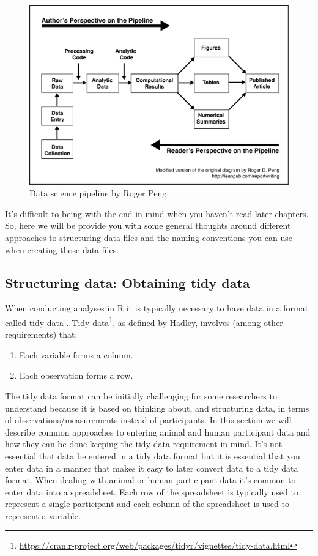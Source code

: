 \documentclass[
]{krantz}
\renewcommand{\href}[2]{#2\footnote{\url{#1}}}
\begin{document}
\begin{figure}
\includegraphics[width=0.85\linewidth]{ch_enter_load/images/pipeline} \caption{Data science pipeline by Roger Peng.}\label{fig:pipeline}
\end{figure}

It's difficult to being with the end in mind when you haven't read later chapters. So, here we will be provide you with some general thoughts around different approaches to structuring data files and the naming conventions you can use when creating those data files.

\hypertarget{structuring-data-obtaining-tidy-data}{%
\subsection{Structuring data: Obtaining tidy data}\label{structuring-data-obtaining-tidy-data}}

When conducting analyses in R it is typically necessary to have data in a format called tidy data \citep{tidy-data}. \href{https://cran.r-project.org/web/packages/tidyr/vignettes/tidy-data.html}{Tidy data}, as defined by Hadley, involves (among other requirements) that:

\begin{enumerate}
\def\labelenumi{\arabic{enumi}.}
\item
  Each variable forms a column.
\item
  Each observation forms a row.
\end{enumerate}

The tidy data format can be initially challenging for some researchers to understand because it is based on thinking about, and structuring data, in terms of observations/measurements instead of participants. In this section we will describe common approaches to entering animal and human participant data and how they can be done keeping the tidy data requirement in mind. It's not essential that data be entered in a tidy data format but it is essential that you enter data in a manner that makes it easy to later convert data to a tidy data format. When dealing with animal or human participant data it's common to enter data into a spreadsheet. Each row of the spreadsheet is typically used to represent a single participant and each column of the spreadsheet is used to represent a variable.
\end{document}
